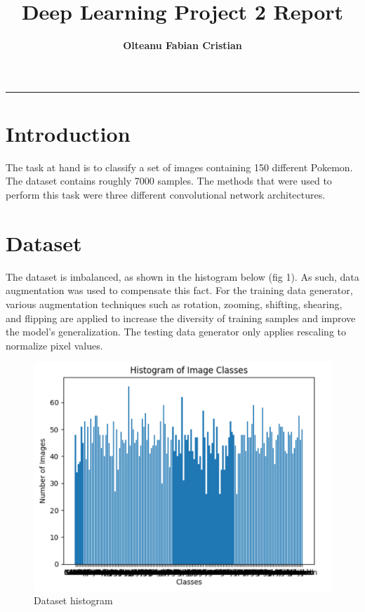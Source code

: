 \documentclass{article}
\author{\textbf{Olteanu Fabian Cristian}}
\affil{FMI, AI Master, Year 2
}
\title{\textbf{\huge Deep Learning Project 2 Report}}
\date{}
\begin{document}
\pagestyle{headings}	
\newpage
\setcounter{page}{1}
\renewcommand{\thepage}{\arabic{page}}


	
	
\setlength{\parskip}{0.5em}
	
\maketitle
	
\noindent\rule{15cm}{0.4pt}

\section{Introduction}
The task at hand is to classify a set of images containing 150 different Pokemon. The dataset contains roughly 7000 samples. The methods that were used to perform this task were three different convolutional network architectures.

\section{Dataset}
The dataset is imbalanced, as shown in the histogram below (fig 1). As such, data augmentation was used to compensate this fact. For the training data generator, various augmentation techniques such as rotation, zooming, shifting, shearing, and flipping are applied to increase the diversity of training samples and improve the model's generalization. The testing data generator only applies rescaling to normalize pixel values.

\begin{figure}[hbt!]
	\centering
	\includegraphics[scale=0.30]{dataset_histogram.png}
	\caption{Dataset histogram}
\end{figure}
\end{document}
